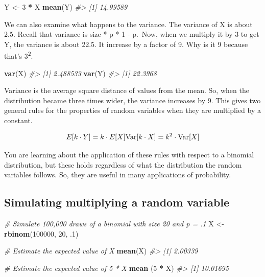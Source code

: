 \documentclass[]{article}
\newenvironment{Shaded}{\begin{snugshade}}{\end{snugshade}}
\newcommand{\CommentTok}[1]{\textcolor[rgb]{0.56,0.35,0.01}{\textit{#1}}}
\newcommand{\DecValTok}[1]{\textcolor[rgb]{0.00,0.00,0.81}{#1}}
\newcommand{\FloatTok}[1]{\textcolor[rgb]{0.00,0.00,0.81}{#1}}
\newcommand{\KeywordTok}[1]{\textcolor[rgb]{0.13,0.29,0.53}{\textbf{#1}}}
\newcommand{\NormalTok}[1]{#1}
\newcommand{\OperatorTok}[1]{\textcolor[rgb]{0.81,0.36,0.00}{\textbf{#1}}}
\newcommand{\StringTok}[1]{\textcolor[rgb]{0.31,0.60,0.02}{#1}}
\begin{document}
\begin{Shaded}
\begin{Highlighting}[]
\NormalTok{Y <-}\StringTok{ }\DecValTok{3} \OperatorTok{*}\StringTok{ }\NormalTok{X}
\KeywordTok{mean}\NormalTok{(Y)}
\CommentTok{#> [1] 14.99589}
\end{Highlighting}
\end{Shaded}

We can also examine what happens to the variance. The variance of X is
about 2.5. Recall that variance is size * p * 1 - p.~Now, when we
multiply it by 3 to get Y, the variance is about 22.5. It increase by a
factor of 9. Why is it 9 because that's 3\textsuperscript{2}.

\begin{Shaded}
\begin{Highlighting}[]
\KeywordTok{var}\NormalTok{(X)}
\CommentTok{#> [1] 2.488533}
\KeywordTok{var}\NormalTok{(Y)}
\CommentTok{#> [1] 22.3968}
\end{Highlighting}
\end{Shaded}

Variance is the average square distance of values from the mean. So,
when the distribution became three times wider, the variance increases
by 9. This gives two general rules for the properties of random
variables when they are multiplied by a constant.

\[E[k \cdot Y] = k \cdot E[X] \\ \textrm{Var}[k \cdot X] = k^2 \cdot \textrm{Var}[X]\]

You are learning about the application of these rules with respect to a
binomial distribution, but these holds regardless of what the
distribution the random variables follows. So, they are useful in many
applications of probability.

\hypertarget{simulating-multiplying-a-random-variable}{%
\subsection{Simulating multiplying a random
variable}\label{simulating-multiplying-a-random-variable}}

\begin{Shaded}
\begin{Highlighting}[]
\CommentTok{# Simulate 100,000 draws of a binomial with size 20 and p = .1}
\NormalTok{X <-}\StringTok{ }\KeywordTok{rbinom}\NormalTok{(}\DecValTok{100000}\NormalTok{, }\DecValTok{20}\NormalTok{, }\FloatTok{.1}\NormalTok{)}

\CommentTok{# Estimate the expected value of X}
\KeywordTok{mean}\NormalTok{(X)}
\CommentTok{#> [1] 2.00339}

\CommentTok{# Estimate the expected value of 5 * X}
\KeywordTok{mean}\NormalTok{ (}\DecValTok{5} \OperatorTok{*}\StringTok{ }\NormalTok{X)}
\CommentTok{#> [1] 10.01695}
\end{Highlighting}
\end{Shaded}
\end{document}
